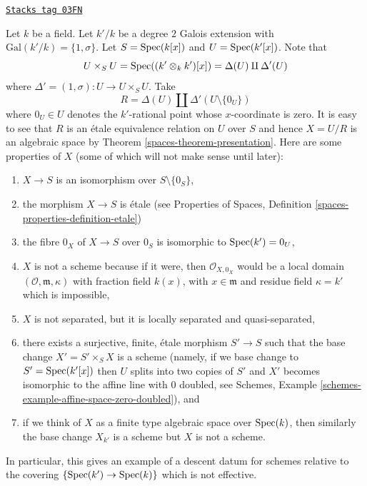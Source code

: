 \begin{example}
\label{spaces-example-non-representable-descent}
\href{https://stacks.math.columbia.edu/tag/03FN}{\texttt{Stacks tag 03FN}}

Let $k$ be a field. Let $k'/k$ be a degree $2$ Galois extension
with $\text{Gal}(k'/k) = \{1, \sigma\}$. Let $S = \operatorname{Spec}(k[x])$
and $U = \operatorname{Spec}(k'[x])$. Note that
$$
U \times_S U =
\operatorname{Spec}((k' \otimes_k k')[x]) =
\Delta(U) \amalg \Delta'(U)
$$
where $\Delta' = (1, \sigma) : U \to U \times_S U$. Take
$$
R = \Delta(U) \amalg \Delta'(U \setminus \{0_U\})
$$
where $0_U \in U$ denotes the $k'$-rational point whose $x$-coordinate is zero.
It is easy to see that $R$ is an \'etale equivalence relation on $U$ over $S$
and hence $X = U/R$ is an algebraic space by
Theorem \ref{spaces-theorem-presentation}. Here are some properties of $X$ (some
of which will not make sense until later):
\begin{enumerate}
\item $X \to S$ is an isomorphism over $S \setminus \{0_S\}$,
\item the morphism $X \to S$ is \'etale (see
Properties of Spaces,
Definition \ref{spaces-properties-definition-etale})
\item the fibre $0_X$ of $X \to S$ over $0_S$ is isomorphic to
$\operatorname{Spec}(k') = 0_U$,
\item $X$ is not a scheme because if it were, then $\mathcal{O}_{X, 0_X}$
would be a local domain $(\mathcal{O}, \mathfrak m, \kappa)$ with
fraction field $k(x)$, with $x \in \mathfrak m$ and residue field
$\kappa = k'$ which is impossible,
\item $X$ is not separated, but it is
locally separated and quasi-separated,
\item there exists a surjective, finite, \'etale morphism $S' \to S$
such that the base change $X' = S' \times_S X$ is a scheme (namely, if
we base change to $S' = \operatorname{Spec}(k'[x])$ then $U$ splits into
two copies of $S'$ and $X'$ becomes isomorphic to the affine line with
$0$ doubled, see
Schemes, Example \ref{schemes-example-affine-space-zero-doubled}), and
\item if we think of $X$ as a finite type algebraic space over
$\operatorname{Spec}(k)$, then similarly the base change $X_{k'}$ is a scheme
but $X$ is not a scheme.
\end{enumerate}
In particular, this gives an example of a descent datum for schemes
relative to the covering $\{\operatorname{Spec}(k') \to \operatorname{Spec}(k)\}$
which is not effective.
\end{example}

